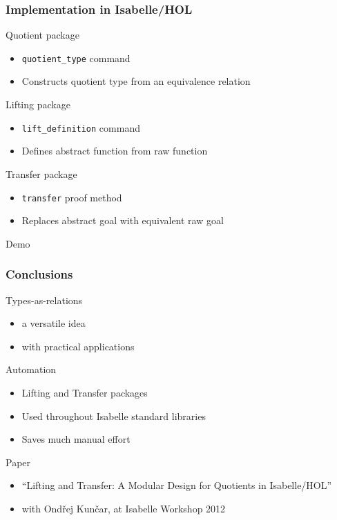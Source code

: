 \documentclass[english]{beamer}
\begin{document}
\begin{frame}
\frametitle{Implementation in Isabelle/HOL}

Quotient package
\begin{itemize}
\item \texttt{quotient\_type} command
\item Constructs quotient type from an equivalence relation
\end{itemize}
\medskip
Lifting package
\begin{itemize}
\item \texttt{lift\_definition} command
\item Defines abstract function from raw function
\end{itemize}
\medskip
Transfer package
\begin{itemize}
\item \texttt{transfer} proof method
\item Replaces abstract goal with equivalent raw goal
\end{itemize}
\bigskip
\large{Demo}
\end{frame}

\begin{frame}
\frametitle{Conclusions}

Types-as-relations
\begin{itemize}
\item a versatile idea
\item with practical applications
\end{itemize}
\medskip
Automation
\begin{itemize}
\item Lifting and Transfer packages
\item Used throughout Isabelle standard libraries
\item Saves much manual effort
\end{itemize}
\medskip
Paper
\begin{itemize}
\item ``Lifting and Transfer: A Modular Design for Quotients in Isabelle/HOL''
\item with Ond\v{r}ej Kun\v{c}ar, at Isabelle Workshop 2012
\end{itemize}

\end{frame}
\end{document}
